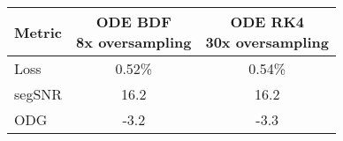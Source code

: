 \begin{tabular}{@{} l|c c @{}}
    \toprule
    Metric & \makecell{\ac{ODE} \acs{BDF}\\8x oversampling} & \makecell{\ac{ODE} \ac{RK}4\\30x oversampling} \\ \midrule
    Loss   & 0.52\% & 0.54\% \\
    segSNR & 16.2 & 16.2 \\
    ODG    & -3.2 & -3.3 \\ \bottomrule
\end{tabular}%

